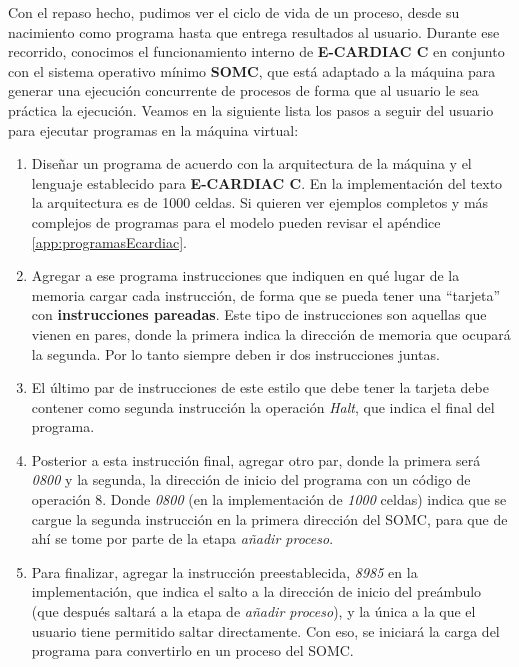 \documentclass[letterpaper,12pt,oneside]{book}
\begin{document}
			Con el repaso hecho, pudimos ver el ciclo de vida de un proceso, desde su nacimiento como programa hasta que entrega resultados al usuario.
			Durante ese recorrido, conocimos el funcionamiento interno de \textbf{E-CARDIAC C} en conjunto con el 
			sistema operativo mínimo \textbf{SOMC}, que
			está adaptado a la máquina para generar una ejecución concurrente de procesos de forma que al usuario le sea práctica la ejecución. Veamos
			en la siguiente lista los pasos a seguir del usuario para ejecutar programas en la máquina virtual:
			
			\begin{enumerate}

				\item Diseñar un programa de acuerdo con la arquitectura de la máquina y el lenguaje establecido para \textbf{E-CARDIAC C}. En
				la implementación del texto la arquitectura es de 1000 celdas. Si quieren ver ejemplos completos y más
				complejos de programas para
				el modelo pueden revisar el apéndice \ref{app:programasEcardiac}.
				\item Agregar a ese programa instrucciones que indiquen en qué lugar de la memoria cargar cada instrucción, de forma que se pueda tener
				una ``tarjeta'' con \textbf{instrucciones pareadas}. Este tipo de instrucciones son aquellas que vienen en pares, donde 
				la primera indica la dirección de memoria que ocupará la segunda. Por lo tanto siempre deben ir dos instrucciones juntas.
				\item El último par de instrucciones de este estilo que debe tener la tarjeta debe contener como segunda instrucción
				la operación \textit{Halt}, que indica el final del programa.
				\item Posterior a esta instrucción final, agregar otro par, donde la primera será \textit{0800} y la segunda, la dirección de inicio del
				programa con un código de operación 8. Donde \textit{0800} (en
				la implementación de \textit{1000} celdas) indica que se cargue la segunda instrucción 
				en la primera dirección del SOMC, para que de ahí se tome por parte de la etapa \textit{añadir proceso}.
				\item Para finalizar, agregar la instrucción preestablecida, \textit{8985} en la implementación, que indica el salto a la dirección de 
				inicio del preámbulo (que después saltará a la etapa de \textit{añadir proceso}), y
				la única a la que el usuario tiene permitido saltar directamente. Con eso, se iniciará la carga del programa para convertirlo en
				un proceso del SOMC.

\end{enumerate}
\end{document}
